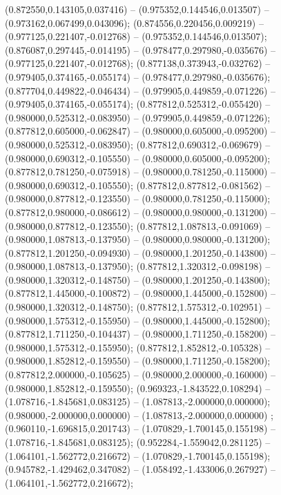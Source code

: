  (0.872550,0.143105,0.037416) -- (0.975352,0.144546,0.013507) -- (0.973162,0.067499,0.043096);
 (0.874556,0.220456,0.009219) -- (0.977125,0.221407,-0.012768) -- (0.975352,0.144546,0.013507);
 (0.876087,0.297445,-0.014195) -- (0.978477,0.297980,-0.035676) -- (0.977125,0.221407,-0.012768);
 (0.877138,0.373943,-0.032762) -- (0.979405,0.374165,-0.055174) -- (0.978477,0.297980,-0.035676);
 (0.877704,0.449822,-0.046434) -- (0.979905,0.449859,-0.071226) -- (0.979405,0.374165,-0.055174);
 (0.877812,0.525312,-0.055420) -- (0.980000,0.525312,-0.083950) -- (0.979905,0.449859,-0.071226);
 (0.877812,0.605000,-0.062847) -- (0.980000,0.605000,-0.095200) -- (0.980000,0.525312,-0.083950);
 (0.877812,0.690312,-0.069679) -- (0.980000,0.690312,-0.105550) -- (0.980000,0.605000,-0.095200);
 (0.877812,0.781250,-0.075918) -- (0.980000,0.781250,-0.115000) -- (0.980000,0.690312,-0.105550);
 (0.877812,0.877812,-0.081562) -- (0.980000,0.877812,-0.123550) -- (0.980000,0.781250,-0.115000);
 (0.877812,0.980000,-0.086612) -- (0.980000,0.980000,-0.131200) -- (0.980000,0.877812,-0.123550);
 (0.877812,1.087813,-0.091069) -- (0.980000,1.087813,-0.137950) -- (0.980000,0.980000,-0.131200);
 (0.877812,1.201250,-0.094930) -- (0.980000,1.201250,-0.143800) -- (0.980000,1.087813,-0.137950);
 (0.877812,1.320312,-0.098198) -- (0.980000,1.320312,-0.148750) -- (0.980000,1.201250,-0.143800);
 (0.877812,1.445000,-0.100872) -- (0.980000,1.445000,-0.152800) -- (0.980000,1.320312,-0.148750);
 (0.877812,1.575312,-0.102951) -- (0.980000,1.575312,-0.155950) -- (0.980000,1.445000,-0.152800);
 (0.877812,1.711250,-0.104437) -- (0.980000,1.711250,-0.158200) -- (0.980000,1.575312,-0.155950);
 (0.877812,1.852812,-0.105328) -- (0.980000,1.852812,-0.159550) -- (0.980000,1.711250,-0.158200);
 (0.877812,2.000000,-0.105625) -- (0.980000,2.000000,-0.160000) -- (0.980000,1.852812,-0.159550);
 (0.969323,-1.843522,0.108294) -- (1.078716,-1.845681,0.083125) -- (1.087813,-2.000000,0.000000);
 (0.980000,-2.000000,0.000000) -- (1.087813,-2.000000,0.000000) ;
 (0.960110,-1.696815,0.201743) -- (1.070829,-1.700145,0.155198) -- (1.078716,-1.845681,0.083125);
 (0.952284,-1.559042,0.281125) -- (1.064101,-1.562772,0.216672) -- (1.070829,-1.700145,0.155198);
 (0.945782,-1.429462,0.347082) -- (1.058492,-1.433006,0.267927) -- (1.064101,-1.562772,0.216672);
